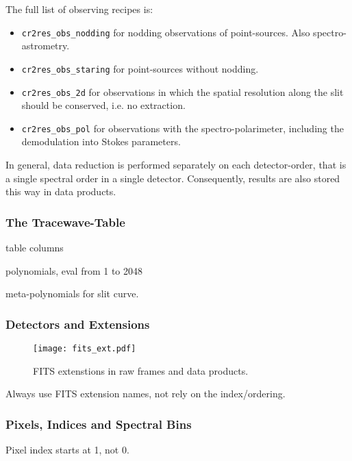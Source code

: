 The full list of observing recipes is:
\begin{itemize}
    \item \texttt{cr2res\_obs\_nodding} for nodding observations of
        point-sources. Also spectro-astrometry.
    \item \texttt{cr2res\_obs\_staring} for point-sources without nodding.
    \item \texttt{cr2res\_obs\_2d} for observations in which the spatial
        resolution along the slit should be conserved, i.e. no extraction.
    \item \texttt{cr2res\_obs\_pol} for observations with the spectro-polarimeter,
        including the demodulation into Stokes parameters. 
\end{itemize}


In general, data reduction is performed separately on each detector-order,
that is a single spectral order in a single detector.
Consequently, results are also stored this way in data products.



\subsubsection{The Tracewave-Table}
\label{sec:tracewave}

table columns

polynomials, eval from 1 to 2048

meta-polynomials for slit curve.

\subsubsection{Detectors and Extensions}
\label{sec:extns}
\begin{figure}[!tb]
  \begin{center}
    \texttt{[image: fits\_ext.pdf]}
  \end{center}
  \caption{
    \label{fig:fits_ext}
    FITS extenstions in raw frames and data products.
    }
\end{figure}

Always use FITS extension names, not rely on the index/ordering.


\subsubsection{Pixels, Indices and Spectral Bins}
Pixel index starts at 1, not 0.

